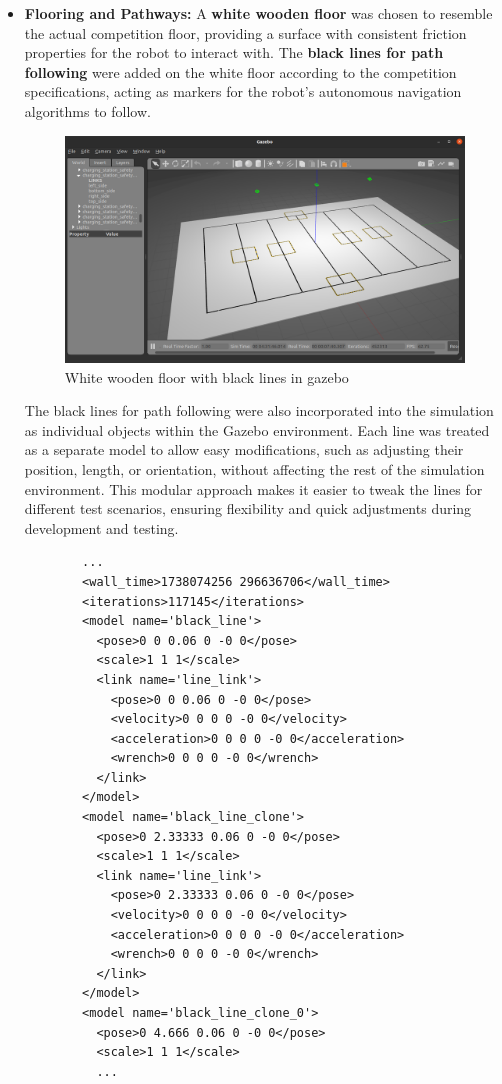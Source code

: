 \documentclass[../../main]{subfiles}
\begin{document}
\begin{itemize}
    \item \textbf{Flooring and Pathways:} A \textbf{white wooden floor} was chosen to resemble the actual competition floor, 
    providing a surface with consistent friction properties for the robot to interact with. The \textbf{black lines for path 
    following} were added on the white floor according to the competition specifications, acting as markers for the robot's autonomous 
    navigation algorithms to follow.

    \begin{figure}[H]
        \centering
    \includegraphics[width=\textwidth]{fig/white_floor.png}
    \caption{White wooden floor with black lines in gazebo}
    \label{White wooden floor} %
    \end{figure}

    The black lines for path following were also incorporated into the simulation as 
    individual objects within the Gazebo environment. Each line was treated as a separate 
    model to allow easy modifications, such as adjusting their position, length, or 
    orientation, without affecting the rest of the simulation environment. This modular 
    approach makes it easier to tweak the lines for different test scenarios, ensuring 
    flexibility and quick adjustments during development and testing.
    
    \begin{verbatim}
        ...
        <wall_time>1738074256 296636706</wall_time>
        <iterations>117145</iterations>
        <model name='black_line'>
          <pose>0 0 0.06 0 -0 0</pose>
          <scale>1 1 1</scale>
          <link name='line_link'>
            <pose>0 0 0.06 0 -0 0</pose>
            <velocity>0 0 0 0 -0 0</velocity>
            <acceleration>0 0 0 0 -0 0</acceleration>
            <wrench>0 0 0 0 -0 0</wrench>
          </link>
        </model>
        <model name='black_line_clone'>
          <pose>0 2.33333 0.06 0 -0 0</pose>
          <scale>1 1 1</scale>
          <link name='line_link'>
            <pose>0 2.33333 0.06 0 -0 0</pose>
            <velocity>0 0 0 0 -0 0</velocity>
            <acceleration>0 0 0 0 -0 0</acceleration>
            <wrench>0 0 0 0 -0 0</wrench>
          </link>
        </model>
        <model name='black_line_clone_0'>
          <pose>0 4.666 0.06 0 -0 0</pose>
          <scale>1 1 1</scale>
          ...
    \end{verbatim}


\end{itemize}
\end{document}
